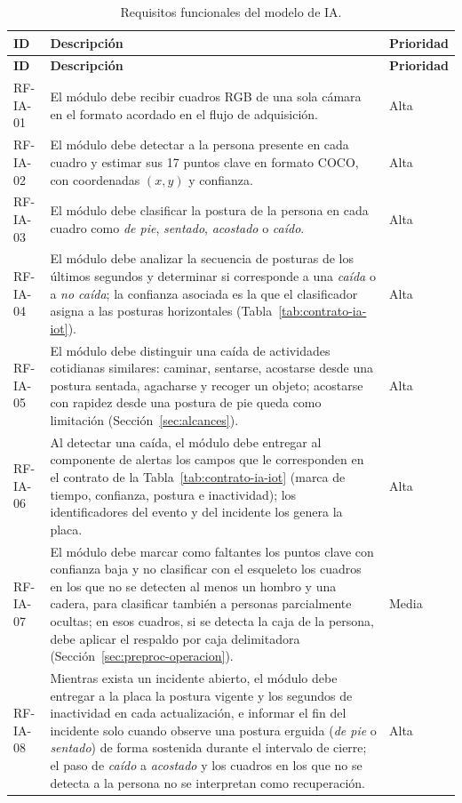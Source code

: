 \documentclass[12pt,a4paper,oneside]{book}
\theoremstyle{plain}
\theoremstyle{definition}
\theoremstyle{remark}
\begin{document}
{\small
\begin{longtable}{L{1.9cm}L{6.6cm}L{1.8cm}}
\caption{Requisitos funcionales del modelo de IA.}\label{tab:rf-ia}\\
\toprule
\textbf{ID} & \textbf{Descripción} & \textbf{Prioridad} \\
\midrule
\endfirsthead
\toprule
\textbf{ID} & \textbf{Descripción} & \textbf{Prioridad} \\
\midrule
\endhead
\bottomrule
\endlastfoot
RF-IA-01 & El módulo debe recibir cuadros RGB de una sola cámara en el formato acordado en el flujo de adquisición. & Alta \\
\addlinespace
RF-IA-02 & El módulo debe detectar a la persona presente en cada cuadro y estimar sus 17 puntos clave en formato COCO, con coordenadas $(x, y)$ y confianza. & Alta \\
\addlinespace
RF-IA-03 & El módulo debe clasificar la postura de la persona en cada cuadro como \textit{de pie}, \textit{sentado}, \textit{acostado} o \textit{caído}. & Alta \\
\addlinespace
RF-IA-04 & El módulo debe analizar la secuencia de posturas de los últimos segundos y determinar si corresponde a una \textit{caída} o a \textit{no caída}; la confianza asociada es la que el clasificador asigna a las posturas horizontales (Tabla~\ref{tab:contrato-ia-iot}). & Alta \\
\addlinespace
RF-IA-05 & El módulo debe distinguir una caída de actividades cotidianas similares: caminar, sentarse, acostarse desde una postura sentada, agacharse y recoger un objeto; acostarse con rapidez desde una postura de pie queda como limitación (Sección~\ref{sec:alcances}). & Alta \\
\addlinespace
RF-IA-06 & Al detectar una caída, el módulo debe entregar al componente de alertas los campos que le corresponden en el contrato de la Tabla~\ref{tab:contrato-ia-iot} (marca de tiempo, confianza, postura e inactividad); los identificadores del evento y del incidente los genera la placa. & Alta \\
\addlinespace
RF-IA-07 & El módulo debe marcar como faltantes los puntos clave con confianza baja y no clasificar con el esqueleto los cuadros en los que no se detecten al menos un hombro y una cadera, para clasificar también a personas parcialmente ocultas; en esos cuadros, si se detecta la caja de la persona, debe aplicar el respaldo por caja delimitadora (Sección~\ref{sec:preproc-operacion}). & Media \\
\addlinespace
RF-IA-08 & Mientras exista un incidente abierto, el módulo debe entregar a la placa la postura vigente y los segundos de inactividad en cada actualización, e informar el fin del incidente solo cuando observe una postura erguida (\textit{de pie} o \textit{sentado}) de forma sostenida durante el intervalo de cierre; el paso de \textit{caído} a \textit{acostado} y los cuadros en los que no se detecta a la persona no se interpretan como recuperación. & Alta \\

\end{longtable}}
\end{document}
